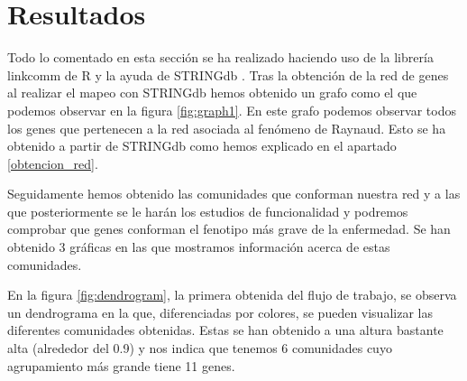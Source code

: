 \section{Resultados}
\label{resultados}
\begin{spacing}{1}
Todo lo comentado en esta sección se ha realizado haciendo uso de la librería linkcomm de R  \cite{Linkcomm}  y la ayuda de STRINGdb \cite{STRINGdb} . 
Tras la obtención de la red de genes al realizar el mapeo con STRINGdb hemos obtenido un grafo como el que podemos observar en la figura \ref{fig:graph1}. En este grafo podemos observar todos los genes que pertenecen a la red asociada al fenómeno de Raynaud. Esto se ha obtenido a partir de STRINGdb como hemos explicado en el apartado \ref{obtencion_red}.
\end{spacing}

\begin{minipage}{\linewidth}
	\label{fig:graph1}
\end{minipage}

\begin{spacing}{1}
	Seguidamente hemos obtenido las comunidades que conforman nuestra red y a las que posteriormente se le harán los estudios de funcionalidad y podremos comprobar que genes conforman el fenotipo más grave de la enfermedad. Se han obtenido 3 gráficas en las que mostramos información acerca de estas comunidades.
	
	En la figura \ref{fig:dendrogram}, la primera obtenida del flujo de trabajo, se observa un dendrograma en la que, diferenciadas por colores, se pueden visualizar las diferentes comunidades obtenidas. Estas se han obtenido a una altura bastante alta (alrededor del 0.9) y nos indica que tenemos 6 comunidades cuyo agrupamiento más grande tiene 11 genes.
\end{spacing}

